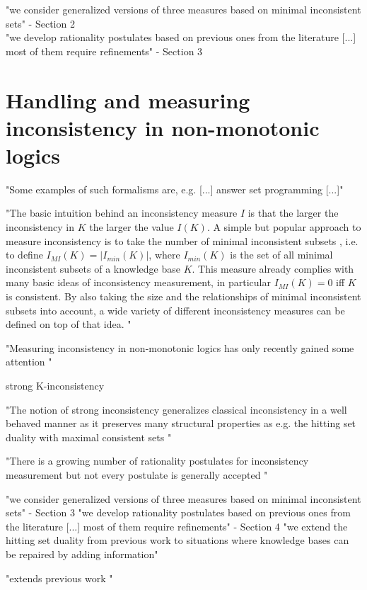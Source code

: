 "we consider generalized versions of three measures based on minimal inconsistent sets" - Section 2\\
"we develop rationality postulates based on previous ones from the literature [...] most of them require refinements" - Section 3

\section{Handling and measuring inconsistency in non-monotonic logics}
\cite{ulbricht_handling_2020}

"Some examples of such formalisms are, e.g. [...] answer set programming \cite{gelfond_logic_2002} [...]"

"The basic intuition behind an inconsistency measure \(I\) is that the larger the inconsistency in \(K\) the larger the value \(I(K)\). A simple but popular approach to measure inconsistency is to take the number of minimal inconsistent subsets \cite{hunter_measuring_2008}, i.e. to define \(I_{MI}(K)=|I_{min}(K)|\), where \(I_{min}(K)\) is the set of all minimal inconsistent subsets of a knowledge base \(K\). This measure already complies with many basic ideas of inconsistency measurement, in particular \(I_{MI}(K)=0\) iff \(K\) is consistent. By also taking the size and the relationships of minimal inconsistent subsets into account, a wide variety of different inconsistency measures can be defined on top of that idea. \cite{hunter_measuring_2008} \cite{jabbour_mis_2016}"

"Measuring inconsistency in non-monotonic logics has only recently gained some attention \cite{ulbricht_measuring_2018} \cite{brewka_strong_2019}"

strong K-inconsistency \cite{brewka_strong_2017}

"The notion of strong inconsistency generalizes classical inconsistency in a well behaved manner as it preserves many structural properties as e.g. the hitting set duality with maximal consistent sets \cite{reiter_theory_1987}"

"There is a growing number of rationality postulates for inconsistency measurement but not every postulate is generally accepted \cite{hameurlain_basic_2017} \cite{ferme_revisiting_2014}"

"we consider generalized versions of three measures based on minimal inconsistent sets" - Section 3
"we develop rationality postulates based on previous ones from the literature [...] most of them require refinements" - Section 4
"we extend the hitting set duality from previous work \cite{brewka_strong_2019} to situations where knowledge bases can be repaired by adding information"

"extends previous work \cite{ulbricht_measuring_2018}"
